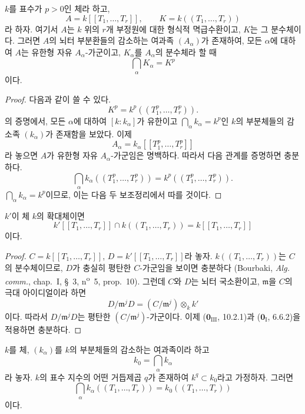 \begin{proposition}[21.8.8]
\label{0.21.8.8-ko}
$k$를 표수가 $p>0$인 체라 하고,
\[
A=k[[T_1,\ldots,T_r]],\qquad K=k((T_1,\ldots,T_r))
\]
라 하자. 여기서 $A$는 $k$ 위의 $r$개 부정원에 대한 형식적
멱급수환이고, $K$는 그 분수체이다. 그러면 $A$의 뇌터 부분환들의
감소하는 여과족 $(A_\alpha)$가 존재하여, 모든 $\alpha$에 대하여
$A$는 유한형 자유 $A_\alpha$-가군이고, $K_\alpha$를
$A_\alpha$의 분수체라 할 때
\[
\bigcap_\alpha K_\alpha=K^p
\]
이다.
\end{proposition}

\begin{proof}
다음과 같이 쓸 수 있다.
\[
K^p=k^p((T_1^p,\ldots,T_r^p)).
\]
의 증명에서, 모든 $\alpha$에 대하여
$[k:k_\alpha]$가 유한이고
$\bigcap_\alpha k_\alpha=k^p$인 $k$의 부분체들의 감소족
$(k_\alpha)$가 존재함을 보았다. 이제
\[
A_\alpha=k_\alpha[[T_1^p,\ldots,T_r^p]]
\]
라 놓으면 $A$가 유한형 자유 $A_\alpha$-가군임은 명백하다.
따라서 다음 관계를 증명하면 충분하다.
\begin{equation}
\tag{21.8.8.1}
\label{0.21.8.8.1-ko}
\bigcap_\alpha k_\alpha((T_1^p,\ldots,T_r^p))
=k^p((T_1^p,\ldots,T_r^p)).
\end{equation}
$\bigcap_\alpha k_\alpha=k^p$이므로, 이는 다음 두 보조정리에서
따를 것이다.
\end{proof}

\begin{lemma}[21.8.8.2]
\label{0.21.8.8.2-ko}
$k'$이 체 $k$의 확대체이면
\[
k'[[T_1,\ldots,T_r]]\cap k((T_1,\ldots,T_r))
=k[[T_1,\ldots,T_r]]
\]
이다.
\end{lemma}

\begin{proof}
$C=k[[T_1,\ldots,T_r]]$, $D=k'[[T_1,\ldots,T_r]]$라 놓자.
$k((T_1,\ldots,T_r))$는 $C$의 분수체이므로, $D$가 충실히 평탄한
$C$-가군임을 보이면 충분하다 (Bourbaki, \emph{Alg. comm.}, chap.~I,
\S~3, n\textsuperscript{o}~5, prop.~10). 그런데 $C$와 $D$는 뇌터
국소환이고, $\mathfrak m$을 $C$의 극대 아이디얼이라 하면
\[
D/\mathfrak m^jD=(C/\mathfrak m^j)\otimes_k k'
\]
이다. 따라서 $D/\mathfrak m^jD$는 평탄한
$(C/\mathfrak m^j)$-가군이다. 이제 ($\mathbf 0_{\mathrm{III}}$,
10.2.1)과 ($\mathbf 0_{\mathrm I}$, 6.6.2)을 적용하면 충분하다.
\end{proof}

\begin{lemma}[21.8.8.3]
\label{0.21.8.8.3-ko}
$k$를 체, $(k_\alpha)$를 $k$의 부분체들의 감소하는 여과족이라 하고
\[
k_0=\bigcap_\alpha k_\alpha
\]
라 놓자. $k$의 표수 지수의 어떤 거듭제곱 $q$가 존재하여
$k^q\subset k_0$라고 가정하자. 그러면
\begin{equation}
\tag{21.8.8.4}
\label{0.21.8.8.4-ko}
\bigcap_\alpha k_\alpha((T_1,\ldots,T_r))
=k_0((T_1,\ldots,T_r))
\end{equation}
이다.
\end{lemma}

